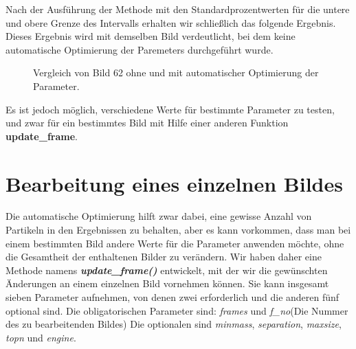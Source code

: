 Nach der Ausführung der Methode mit den Standardprozentwerten für die untere und obere Grenze des Intervalls erhalten wir schließlich das folgende Ergebnis. Dieses Ergebnis wird mit demselben Bild verdeutlicht, bei dem keine automatische Optimierung der Paremeters durchgeführt wurde.

\begin{figure}[H]
    \centering
    \caption{Vergleich von Bild 62 ohne und mit automatischer Optimierung der Parameter.}
    \label{fig:kap3_vergleich_Bild_62_mit_ohne}
\end{figure}
Es ist jedoch möglich, verschiedene Werte für bestimmte Parameter zu testen, und zwar für ein bestimmtes Bild mit Hilfe einer anderen Funktion \textbf{update\_frame}.

\section{Bearbeitung eines einzelnen Bildes \label{kap3_bearb_einz_bild}}
Die automatische Optimierung hilft zwar dabei, eine gewisse Anzahl von Partikeln in den Ergebnissen zu behalten, aber es kann vorkommen, dass man bei einem bestimmten Bild andere Werte für die Parameter anwenden möchte, ohne die Gesamtheit der enthaltenen Bilder zu verändern. 
Wir haben daher eine Methode namens \textit{\textbf{update\_frame()}} entwickelt, mit der wir die gewünschten Änderungen an einem einzelnen Bild vornehmen können.
Sie kann insgesamt sieben Parameter aufnehmen, von denen zwei erforderlich und die anderen fünf optional sind. Die obligatorischen Parameter sind: \textit{frames} und \textit{f\_no}(Die Nummer des zu bearbeitenden Bildes)
Die optionalen sind \textit{minmass}, \textit{separation}, \textit{maxsize}, \textit{topn} und \textit{engine}.

